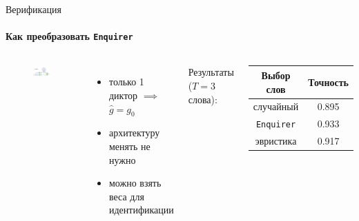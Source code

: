 \documentclass[aspectratio=169]{beamer}
\newcommand{\enquirer}{\texttt{Enquirer}}
\begin{document}
\begin{frame}{Верификация}
    \framesubtitle{Как преобразовать \enquirer}
    \begin{columns}
        \begin{figure}[bht]
        \includegraphics[width=.9\textwidth]{enquirer.png}
        \end{figure}

        \begin{itemize}
            \item только 1 диктор $\implies$ $\hat{g} = g_0$
            \item архитектуру менять не нужно
            \item можно взять веса для идентификации
        \end{itemize}\vspace{1em}

        Результаты ($T = 3$ слова):
        \begin{center}
            \begin{tabular}{c c}
                \toprule
                Выбор слов & Точность\\
                \midrule
                случайный & 0.895\\
                \enquirer{} & 0.933\\
                эвристика & 0.917\\
                \bottomrule
            \end{tabular}
        \end{center}
    \end{columns}
\end{frame}
\end{document}
